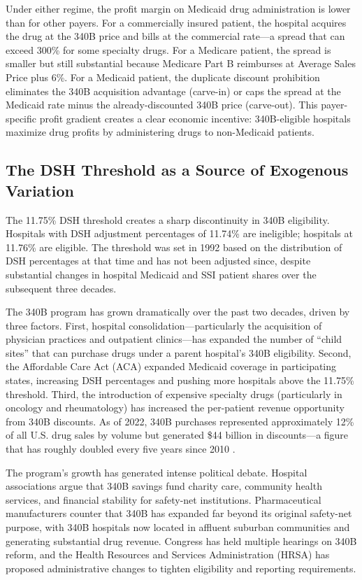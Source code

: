\documentclass[12pt]{article}
\begin{document}
Under either regime, the profit margin on Medicaid drug administration is lower than for other payers. For a commercially insured patient, the hospital acquires the drug at the 340B price and bills at the commercial rate---a spread that can exceed 300\% for some specialty drugs. For a Medicare patient, the spread is smaller but still substantial because Medicare Part B reimburses at Average Sales Price plus 6\%. For a Medicaid patient, the duplicate discount prohibition eliminates the 340B acquisition advantage (carve-in) or caps the spread at the Medicaid rate minus the already-discounted 340B price (carve-out). This payer-specific profit gradient creates a clear economic incentive: 340B-eligible hospitals maximize drug profits by administering drugs to non-Medicaid patients.


\subsection{The DSH Threshold as a Source of Exogenous Variation}

The 11.75\% DSH threshold creates a sharp discontinuity in 340B eligibility. Hospitals with DSH adjustment percentages of 11.74\% are ineligible; hospitals at 11.76\% are eligible. The threshold was set in 1992 based on the distribution of DSH percentages at that time and has not been adjusted since, despite substantial changes in hospital Medicaid and SSI patient shares over the subsequent three decades.

The 340B program has grown dramatically over the past two decades, driven by three factors. First, hospital consolidation---particularly the acquisition of physician practices and outpatient clinics---has expanded the number of ``child sites'' that can purchase drugs under a parent hospital's 340B eligibility. Second, the Affordable Care Act (ACA) expanded Medicaid coverage in participating states, increasing DSH percentages and pushing more hospitals above the 11.75\% threshold. Third, the introduction of expensive specialty drugs (particularly in oncology and rheumatology) has increased the per-patient revenue opportunity from 340B discounts. As of 2022, 340B purchases represented approximately 12\% of all U.S. drug sales by volume but generated \$44 billion in discounts---a figure that has roughly doubled every five years since 2010 \citep{drugchannels2023}.

The program's growth has generated intense political debate. Hospital associations argue that 340B savings fund charity care, community health services, and financial stability for safety-net institutions. Pharmaceutical manufacturers counter that 340B has expanded far beyond its original safety-net purpose, with 340B hospitals now located in affluent suburban communities and generating substantial drug revenue. Congress has held multiple hearings on 340B reform, and the Health Resources and Services Administration (HRSA) has proposed administrative changes to tighten eligibility and reporting requirements.
\end{document}

